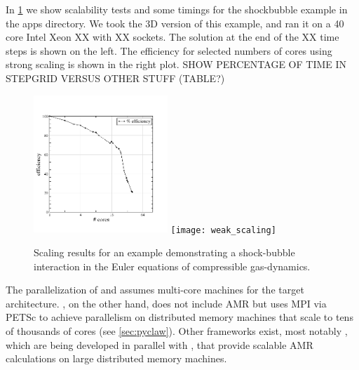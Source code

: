 In \cref{fig:amr_scaling} we show scalability tests and some timings for
the shockbubble example in the \clawpack apps directory.  We took the 3D
version of this example, and ran it on a 40 core Intel Xeon XX with XX
sockets. The solution at the end of the XX time steps is shown on the
left.  The efficiency for selected numbers of cores using strong
scaling is shown in the right plot.
SHOW PERCENTAGE OF TIME IN STEPGRID VERSUS OTHER STUFF (TABLE?)

\begin{figure}[h]
    \centering
    \includegraphics[width=0.45\textwidth]{efficiency}
    \texttt{[image: weak\_scaling]}
    \caption{Scaling results for an \amrclaw example demonstrating a
    shock-bubble interaction in the Euler equations of compressible
    gas-dynamics.}
    \label{fig:amr_scaling}
\end{figure}

The parallelization of \amrclaw and \geoclaw assumes multi-core machines for the
target architecture.  \pyclaw, on the other hand, does not include AMR but uses
MPI via PETSc to achieve parallelism on distributed memory machines that scale
to tens of thousands of cores (see \cref{sec:pyclaw}). Other frameworks exist,
most notably \forestclaw \cite{Burstedde:we}, which are being developed in
parallel with \amrclaw, that provide scalable AMR calculations on large
distributed
memory machines.

